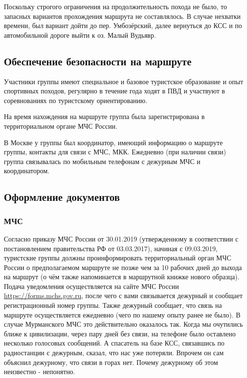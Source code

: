 Поскольку строгого ограничения на продолжительность похода не было, то запасных вариантов прохождения маршрута не
составлялось. В случае нехватки времени, был вариант дойти до пер. Умбозёрский, далее вернуться до КСС
и по автомобильной дороге выйти к оз. Малый Вудьявр.

\subsection{Обеспечение безопасности на маршруте}
Участники группы имеют специальное и базовое туристское образование и опыт спортивных походов, регулярно в течение года ходят в ПВД и участвуют в соревнованиях по туристскому ориентированию.

На время нахождения на маршруте группа была зарегистрирована в территориальном органе МЧС России.

В Москве у группы был координатор, имеющий информацию о маршруте группы, контакты для связи с МЧС, МКК.
Ежедневно (при наличии связи) группа связывалась по мобильным телефонам с дежурным МЧС и координатором.

\subsection{Оформление документов}
\subsubsection{МЧС}
Согласно приказу МЧС России  от 30.01.2019 (утвержденному в соответствии с
постановлением правительства РФ  от 03.03.2017), начиная с 09.03.2019, туристские группы должны
проинформировать территориальный орган МЧС России о предполагаемом маршруте не позже чем за 10 рабочих дней
до выхода на маршрут (о чём также напоминается в маршрутной книжке нового образца).
Подача уведомления осуществляется на сайте МЧС России \url{https://forms.mchs.gov.ru},
после чего с вами связывается дежурный и сообщает регистрационный номер группы.
Также дежурный сообщает, что связь на маршруте осуществляется ежедневно (чего по нашему опыту ранее не было).
В случае Мурманского МЧС это действительно оказалось так. Когда мы очутились ближе к цивилизации,
через пару дней без связи, на телефоне было оставлено несколько голосовых сообщений.
А спасатель на базе КСС, связавшись по радиостанции с дежурным, сказал, что нас уже потеряли.
Впрочем он сам объяснил дежурному, что связи в горах нет. Почему дежурному об этом неизвестно - непонятно.

